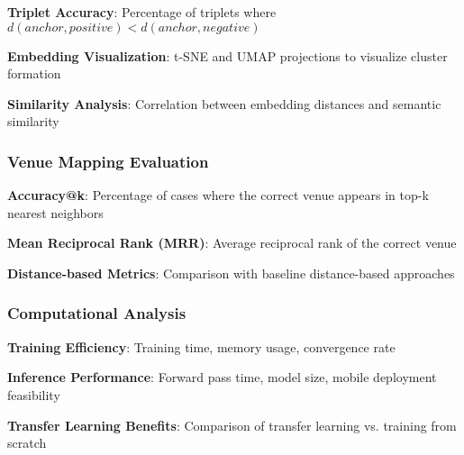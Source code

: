 \textbf{Triplet Accuracy}: Percentage of triplets where $d(anchor, positive) < d(anchor, negative)$

\textbf{Embedding Visualization}: t-SNE and UMAP projections to visualize cluster formation

\textbf{Similarity Analysis}: Correlation between embedding distances and semantic similarity

\subsubsection{Venue Mapping Evaluation}

\textbf{Accuracy@k}: Percentage of cases where the correct venue appears in top-k nearest neighbors

\textbf{Mean Reciprocal Rank (MRR)}: Average reciprocal rank of the correct venue

\textbf{Distance-based Metrics}: Comparison with baseline distance-based approaches

\subsubsection{Computational Analysis}

\textbf{Training Efficiency}: Training time, memory usage, convergence rate

\textbf{Inference Performance}: Forward pass time, model size, mobile deployment feasibility

\textbf{Transfer Learning Benefits}: Comparison of transfer learning vs. training from scratch
